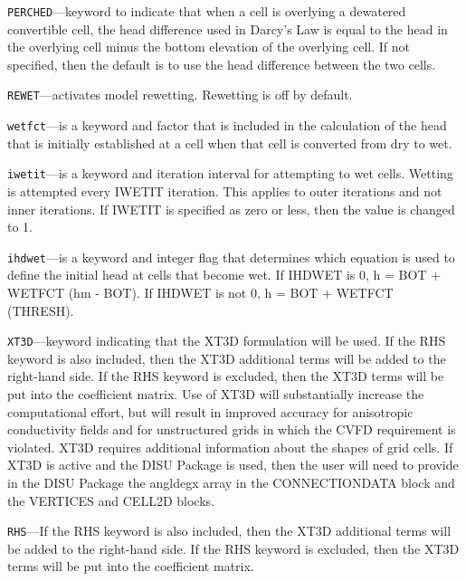 \begin{description}
\item \texttt{PERCHED}---keyword to indicate that when a cell is overlying a dewatered convertible cell, the head difference used in Darcy's Law is equal to the head in the overlying cell minus the bottom elevation of the overlying cell.  If not specified, then the default is to use the head difference between the two cells.

\item \texttt{REWET}---activates model rewetting.  Rewetting is off by default.

\item \texttt{wetfct}---is a keyword and factor that is included in the calculation of the head that is initially established at a cell when that cell is converted from dry to wet.

\item \texttt{iwetit}---is a keyword and iteration interval for attempting to wet cells. Wetting is attempted every IWETIT iteration. This applies to outer iterations and not inner iterations. If IWETIT is specified as zero or less, then the value is changed to 1.

\item \texttt{ihdwet}---is a keyword and integer flag that determines which equation is used to define the initial head at cells that become wet.  If IHDWET is 0, h = BOT + WETFCT (hm - BOT). If IHDWET is not 0, h = BOT + WETFCT (THRESH).

\item \texttt{XT3D}---keyword indicating that the XT3D formulation will be used.  If the RHS keyword is also included, then the XT3D additional terms will be added to the right-hand side.  If the RHS keyword is excluded, then the XT3D terms will be put into the coefficient matrix.  Use of XT3D will substantially increase the computational effort, but will result in improved accuracy for anisotropic conductivity fields and for unstructured grids in which the CVFD requirement is violated.  XT3D requires additional information about the shapes of grid cells.  If XT3D is active and the DISU Package is used, then the user will need to provide in the DISU Package the angldegx array in the CONNECTIONDATA block and the VERTICES and CELL2D blocks.

\item \texttt{RHS}---If the RHS keyword is also included, then the XT3D additional terms will be added to the right-hand side.  If the RHS keyword is excluded, then the XT3D terms will be put into the coefficient matrix.


\end{description}
